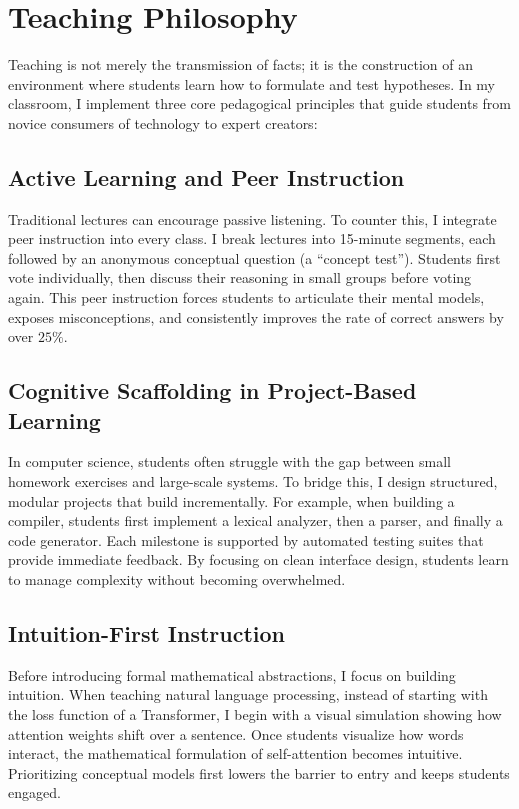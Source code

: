 \section{Teaching Philosophy}
Teaching is not merely the transmission of facts; it is the construction of an environment where students learn how to formulate and test hypotheses. In my classroom, I implement three core pedagogical principles that guide students from novice consumers of technology to expert creators:

\subsection{Active Learning and Peer Instruction}
Traditional lectures can encourage passive listening. To counter this, I integrate peer instruction into every class. I break lectures into 15-minute segments, each followed by an anonymous conceptual question (a ``concept test''). Students first vote individually, then discuss their reasoning in small groups before voting again. This peer instruction forces students to articulate their mental models, exposes misconceptions, and consistently improves the rate of correct answers by over $25\%$.

\subsection{Cognitive Scaffolding in Project-Based Learning}
In computer science, students often struggle with the gap between small homework exercises and large-scale systems. To bridge this, I design structured, modular projects that build incrementally. For example, when building a compiler, students first implement a lexical analyzer, then a parser, and finally a code generator. Each milestone is supported by automated testing suites that provide immediate feedback. By focusing on clean interface design, students learn to manage complexity without becoming overwhelmed.

\subsection{Intuition-First Instruction}
Before introducing formal mathematical abstractions, I focus on building intuition. When teaching natural language processing, instead of starting with the loss function of a Transformer, I begin with a visual simulation showing how attention weights shift over a sentence. Once students visualize how words interact, the mathematical formulation of self-attention becomes intuitive. Prioritizing conceptual models first lowers the barrier to entry and keeps students engaged.

